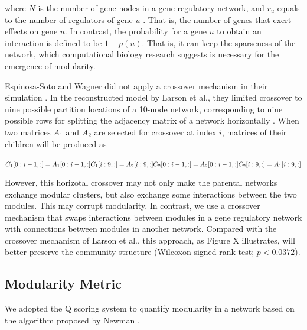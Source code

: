 where $N$ is the number of gene nodes in a gene regulatory network, and $r_{u}$ equals to the number of regulators of gene $u$ \cite{espinosa2010specialization}. That is, the number of genes that exert effects on gene $u$. In contrast, the probability for a gene $u$ to obtain an interaction is defined to be $1-p(u)$. That is, it can keep the sparseness of the network, which computational biology research suggests is necessary for the emergence of modularity. 

Espinosa-Soto and Wagner did not apply a crossover mechanism in their simulation \cite{espinosa2010specialization}. In the reconstructed model by Larson et al., they limited crossover to nine possible partition locations of a 10-node network, corresponding to nine possible rows for splitting the adjacency matrix of a network horizontally \cite{larson2016recombination}. When two matrices $A_{1}$ and $A_{2}$ are selected for crossover at index $i$, matrices of their children will be produced as \\ \\
$C_{1}[0: i-1, :] = A_{1}[0: i-1, :]\\
C_{1}[i: 9, :] = A_{2}[i: 9, :]\\
C_{2}[0: i-1, :] = A_{2}[0: i-1, :]\\
C_{2}[i: 9, :] = A_{1}[i: 9, :]\\$

However, this horizotal crossover may not only make the parental networks exchange modular clusters, but also exchange some interactions between the two modules. This may corrupt modularity. In contrast, we use a crossover mechanism that swaps interactions between modules in a gene regulatory network with connections between modules in another network. Compared with the crossover mechanism of Larson et al., this approach, as Figure X illustrates, will better preserve the community structure (Wilcoxon signed-rank test; $p<0.0372$). 

\subsection{Modularity Metric}
We adopted the Q scoring system to quantify modularity in a network based on the algorithm proposed by Newman \cite{newman2004finding}. 





